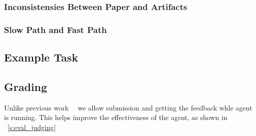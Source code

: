 \subsubsection{Inconsistensies Between Paper and Artifacts}
\label{s:inconsistencies}

\subsubsection{Slow Path and Fast Path}
\label{s:slow_and_fast}

\subsection{Example Task}
\label{s:task_example}


\subsection{Grading}
\label{s:grading}

Unlike previous work~~\cite{DBLP:conf/emnlp/BoginYG0BCSK24,DBLP:journals/tmlr/SiegelKNSN24} we allow submission and getting the feedback whle agent is running.
This helps improve the effectiveness of the agent, as shown in ~\ref{s:eval_judging}

